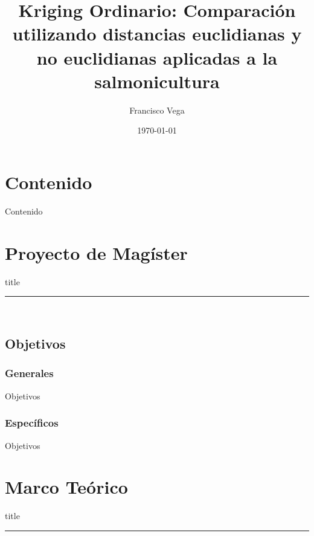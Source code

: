 \documentclass[pdftex,spanish]{beamer}
\title{Kriging Ordinario: Comparación utilizando distancias euclidianas y no euclidianas aplicadas a la salmonicultura}
\author{Francisco Vega}
\institute{Pontificia Universidad Cat\'olica de Chile}
\date{\today}
\begin{document}
{ 
\frame{\titlepage}}

\section*{Contenido}\begin{frame}{Contenido}\tableofcontents\end{frame}

\section{Proyecto de Magíster}
    \begin{frame}[plain]
        \vfill
      \centering
      \begin{beamercolorbox}[sep=8pt,center,shadow=true,rounded=true]{title}
        \insertsectionhead\par%
        \color{oxfordblue}\noindent\rule{10cm}{1pt} \\
        \LARGE{\faFileTextO}
      \end{beamercolorbox}
      \vfill
  \end{frame}


\subsection{Objetivos}
\subsubsection{Generales}

\begin{frame}{Objetivos}


\end{frame}

\subsubsection{Espec\'ificos}

\begin{frame}{Objetivos}



\end{frame}

\section{Marco Te\'orico}
    \begin{frame}[plain]
        \vfill
      \centering
      \begin{beamercolorbox}[sep=8pt,center,shadow=true,rounded=true]{title}
        \insertsectionhead\par%
        \color{oxfordblue}\noindent\rule{10cm}{1pt} \\
        \LARGE{\faFileTextO}
      \end{beamercolorbox}
      \vfill
  \end{frame}
\end{document}
